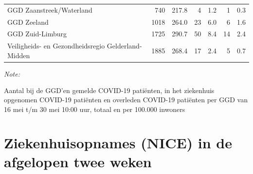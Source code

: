 \documentclass[
  english,
  man,floatsintext]{apa6}
\begin{document}
\begin{table}
\begin{threeparttable}
\begin{tabular}{lrrrrrr}
GGD Zaanstreek/Waterland & 740 & 217.8 & 4 & 1.2 & 1 & 0.3\\
GGD Zeeland & 1018 & 264.0 & 23 & 6.0 & 6 & 1.6\\
GGD Zuid-Limburg & 1725 & 290.7 & 50 & 8.4 & 14 & 2.4\\
Veiligheids- en Gezondheidsregio Gelderland-Midden & 1885 & 268.4 & 17 & 2.4 & 5 & 0.7\\
\bottomrule
\end{tabular}
\begin{tablenotes}
\item \textit{Note: } 
\item Aantal bij de GGD’en gemelde COVID-19 patiënten, in het ziekenhuis opgenomen COVID-19 patiënten en overleden COVID-19 patiënten per GGD van 16 mei t/m 30 mei 10:00 uur, totaal en per 100.000 inwoners
\end{tablenotes}
\end{threeparttable}
\endgroup{}
\end{table}

\newpage

\hypertarget{ziekenhuisopnames-nice-in-de-afgelopen-twee-weken}{%
\section{Ziekenhuisopnames (NICE) in de afgelopen twee weken}\label{ziekenhuisopnames-nice-in-de-afgelopen-twee-weken}}
\end{document}
